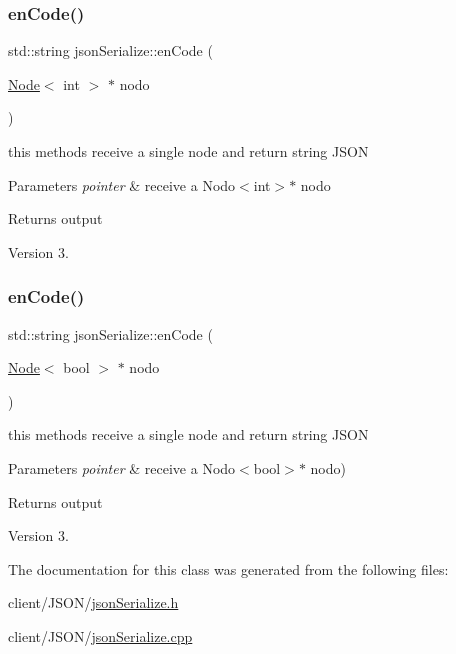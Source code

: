 \subsubsection{\texorpdfstring{en\+Code()}{enCode()}\hspace{0.1cm}{\footnotesize\ttfamily [2/3]}}
{\footnotesize\ttfamily std\+::string json\+Serialize\+::en\+Code (\begin{DoxyParamCaption}\item[{\hyperlink{class_node}{Node}$<$ int $>$ $\ast$}]{nodo }\end{DoxyParamCaption})\hspace{0.3cm}{\ttfamily [static]}}



this methods receive a single node and return string J\+S\+ON 


\begin{DoxyParams}{Parameters}
{\em pointer} & receive a Nodo$<$int$>$$\ast$ nodo \\
\hline
\end{DoxyParams}
\begin{DoxyReturn}{Returns}
output 
\end{DoxyReturn}
\begin{DoxyVersion}{Version}
3. 
\end{DoxyVersion}
\mbox{\label{classjson_serialize_ac520a247d3b3f9057c81ec0c518bcfe3}} 
\subsubsection{\texorpdfstring{en\+Code()}{enCode()}\hspace{0.1cm}{\footnotesize\ttfamily [3/3]}}
{\footnotesize\ttfamily std\+::string json\+Serialize\+::en\+Code (\begin{DoxyParamCaption}\item[{\hyperlink{class_node}{Node}$<$ bool $>$ $\ast$}]{nodo }\end{DoxyParamCaption})\hspace{0.3cm}{\ttfamily [static]}}



this methods receive a single node and return string J\+S\+ON 


\begin{DoxyParams}{Parameters}
{\em pointer} & receive a Nodo$<$bool$>$$\ast$ nodo) \\
\hline
\end{DoxyParams}
\begin{DoxyReturn}{Returns}
output 
\end{DoxyReturn}
\begin{DoxyVersion}{Version}
3. 
\end{DoxyVersion}


The documentation for this class was generated from the following files\+:\begin{DoxyCompactItemize}
\item 
client/\+J\+S\+O\+N/\hyperlink{json_serialize_8h}{json\+Serialize.\+h}\item 
client/\+J\+S\+O\+N/\hyperlink{json_serialize_8cpp}{json\+Serialize.\+cpp}\end{DoxyCompactItemize}
